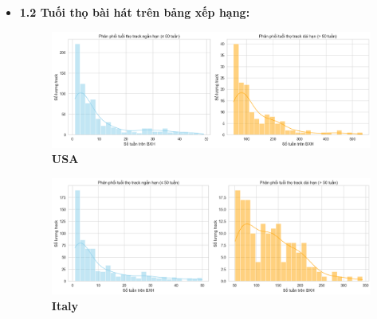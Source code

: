 \begin{itemize}
    \item \textbf{1.2 Tuối thọ bài hát trên bảng xếp hạng:}



    \begin{figure}[H]
        \centering
        \begin{minipage}{0.45\textwidth}
            \centering
            \includegraphics[width=\linewidth]{../graphics/data_top50/figure/11/EDA_usa.png}
            \\[4pt] {\small \textbf{USA}}
        \end{minipage}
        \hfill
        \begin{minipage}{0.45\textwidth}
            \centering
            \includegraphics[width=\linewidth]{../graphics/data_top50/figure/11/EDA_italy.png}
            \\[4pt] {\small \textbf{Italy}}
        \end{minipage}

        \vspace{0.4cm}


\end{figure}
\end{itemize}
